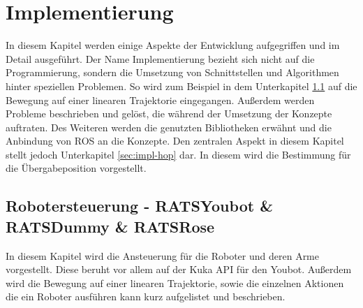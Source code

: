 \section{Implementierung}
\label{sec:impl}

In diesem Kapitel werden einige Aspekte der Entwicklung aufgegriffen und im Detail ausgeführt. Der Name Implementierung bezieht sich nicht auf die Programmierung, sondern die Umsetzung von Schnittstellen und Algorithmen hinter speziellen Problemen. So wird zum Beispiel in dem Unterkapitel \ref{sec:impl-rs} auf die Bewegung auf einer linearen Trajektorie eingegangen. Außerdem werden Probleme beschrieben und gelöst, die während der Umsetzung der Konzepte auftraten. Des Weiteren werden die genutzten Bibliotheken erwähnt und die Anbindung von ROS an die Konzepte. Den zentralen Aspekt in diesem Kapitel stellt jedoch Unterkapitel \ref{sec:impl-hop} dar. In diesem wird die Bestimmung für die Übergabeposition vorgestellt.

\subsection{Robotersteuerung - RATSYoubot \& RATSDummy \& RATSRose}
\label{sec:impl-rs}
In diesem Kapitel wird die Ansteuerung für die Roboter und deren Arme vorgestellt. Diese beruht vor allem auf der Kuka API für den Youbot. Außerdem wird die Bewegung auf einer linearen Trajektorie, sowie die einzelnen Aktionen die ein Roboter ausführen kann kurz aufgelistet und beschrieben.

